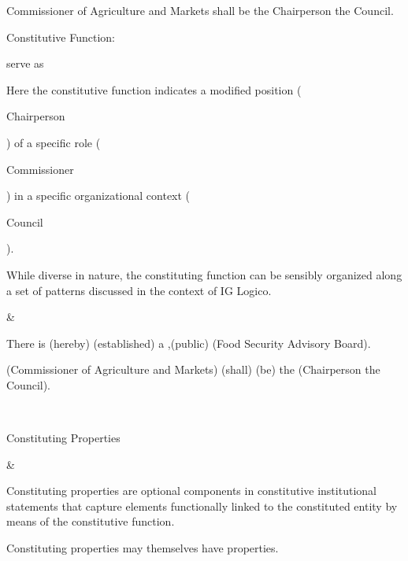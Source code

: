 \begin{landscape}
\begin{longtable}{\tabledims}
\begin{exi}Commissioner of Agriculture and Markets shall be the Chairperson the Council.\end{exi}

\sp

Constitutive Function: \begin{exi}\lsi serve as\rsi\end{exi}

\sp

Here the constitutive function indicates a modified position (\begin{exi}Chairperson\end{exi}) of a specific role (\begin{exi}Commissioner\end{exi}) in a specific organizational context (\begin{exi}Council\end{exi}).

\sp

While diverse in nature, the constituting function can be sensibly organized along a set of patterns discussed in the context of IG Logico.

&

\vspace{0.03cm}

\begin{exi}There is \Cexconst{}(hereby) \F{}(established) a \E{},\propconst{}(public) \E{}(Food Security Advisory Board).\end{exi}

\vspace{3.5cm}

\begin{exi}\Pp{}(Commissioner of Agriculture and Markets) \M{}(shall) \F{}(be) the \E{}(Chairperson the Council).\end{exi}

\\

\newpage

\midrule

\begin{exi}Constituting Properties\end{exi}

&

Constituting properties are optional components in constitutive institutional statements that capture elements functionally linked to the constituted entity by means of the constitutive function. 

Constituting properties may themselves have properties.


\end{longtable}
\end{landscape}
